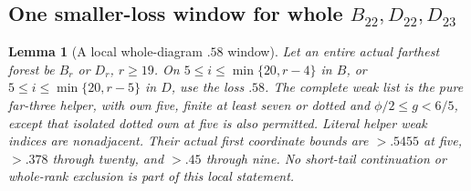 \documentclass[11pt]{article}
\newtheorem{lemma}[theorem]{Lemma}
\theoremstyle{definition}
\theoremstyle{remark}
\begin{document}
\subsection[One smaller-loss window for whole B22,D22,D23]{One smaller-loss window for whole $B_{22},D_{22},D_{23}$}
\label{app:tail:whole58}
\begin{lemma}[A local whole-diagram $.58$ window]
\label{app:tail:lem:whole58local}
Let an entire actual farthest forest be $B_r$ or $D_r$, $r\ge19$.
On $5\le i\le\min\{20,r-4\}$ in $B$, or
$5\le i\le\min\{20,r-5\}$ in $D$, use the loss $.58$.
The complete weak list is the pure far-three helper, with own five,
finite at least seven or dotted and $\phi/2\le g<6/5$, except
that isolated dotted own at five is also permitted.
Literal helper weak indices are nonadjacent. Their actual first
coordinate bounds are $>.5455$ at five, $>.378$ through twenty,
and $>.45$ through nine. No short-tail continuation or whole-rank
exclusion is part of this local statement.
\end{lemma}
\end{document}
